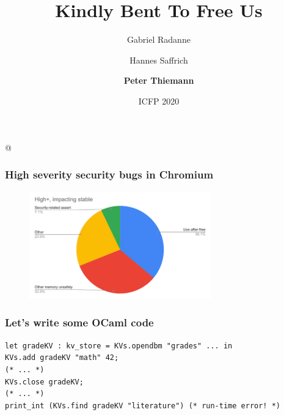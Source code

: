 \documentclass[aspectratio=169,dvipsnames,svgnames,10pt]{beamer}
\title{Kindly Bent To Free Us}
\author{{Gabriel {Radanne}}
  \and Hannes {Saffrich}
  \and \textbf{Peter {Thiemann}}}
\date{ICFP 2020}
\begin{document}
\lstMakeShortInline[keepspaces,basicstyle=\small\ttfamily]@

\frame[plain]{\titlepage}


\begin{frame}
  \frametitle{High severity security bugs in Chromium}

  \begin{figure}[h]
    \centering
    \includegraphics[width=0.7\textwidth]
    {chromium-use-after-free}
  \end{figure}

  
\end{frame}

\begin{frame}[fragile]
  \frametitle{Let's write some OCaml code}

\begin{verbatim}
let gradeKV : kv_store = KVs.opendbm "grades" ... in
KVs.add gradeKV "math" 42;
(* ... *)
KVs.close gradeKV;
(* ... *)
print_int (KVs.find gradeKV "literature") (* run-time error! *)
\end{verbatim}
  
\end{frame}
\end{document}
